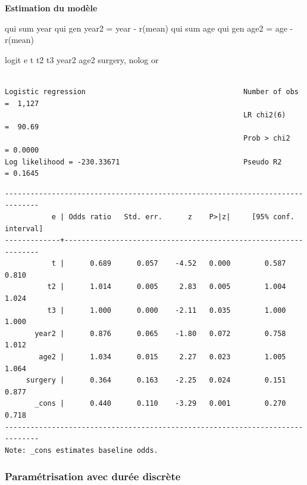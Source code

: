 \documentclass[
  12pt,
  letterpaper,
  DIV=11,
  numbers=noendperiod,
  onepage,
  openany]{scrreprt}
\newenvironment{Shaded}{\begin{snugshade}}{\end{snugshade}}
\newcommand{\FunctionTok}[1]{\textcolor[rgb]{0.94,0.94,0.56}{#1}}
\newcommand{\KeywordTok}[1]{\textcolor[rgb]{0.94,0.87,0.69}{#1}}
\newcommand{\NormalTok}[1]{\textcolor[rgb]{0.80,0.80,0.80}{#1}}
\newcommand{\OtherTok}[1]{\textcolor[rgb]{0.94,0.94,0.56}{#1}}
\begin{document}
\textbf{Estimation du modèle}

\begin{Shaded}
\begin{Highlighting}[]
\KeywordTok{qui} \KeywordTok{sum} \FunctionTok{year}
\KeywordTok{qui} \KeywordTok{gen}\NormalTok{ year2 = }\FunctionTok{year}\NormalTok{ {-} }\OtherTok{\textasciigrave{}r(mean)\textquotesingle{}}
\KeywordTok{qui} \KeywordTok{sum}\NormalTok{ age}
\KeywordTok{qui} \KeywordTok{gen}\NormalTok{ age2 = age {-} }\OtherTok{\textasciigrave{}r(mean)\textquotesingle{}}


\KeywordTok{logit} \FunctionTok{e}\NormalTok{ t t2 t3 year2 age2 surgery, }\KeywordTok{nolog} \KeywordTok{or}
\end{Highlighting}
\end{Shaded}

\begin{verbatim}

Logistic regression                                     Number of obs =  1,127
                                                        LR chi2(6)    =  90.69
                                                        Prob > chi2   = 0.0000
Log likelihood = -230.33671                             Pseudo R2     = 0.1645
\end{verbatim}

\begin{verbatim}
------------------------------------------------------------------------------
           e | Odds ratio   Std. err.      z    P>|z|     [95% conf. interval]
-------------+----------------------------------------------------------------
           t |      0.689      0.057    -4.52   0.000        0.587       0.810
          t2 |      1.014      0.005     2.83   0.005        1.004       1.024
          t3 |      1.000      0.000    -2.11   0.035        1.000       1.000
       year2 |      0.876      0.065    -1.80   0.072        0.758       1.012
        age2 |      1.034      0.015     2.27   0.023        1.005       1.064
     surgery |      0.364      0.163    -2.25   0.024        0.151       0.877
       _cons |      0.440      0.110    -3.29   0.001        0.270       0.718
------------------------------------------------------------------------------
Note: _cons estimates baseline odds.
\end{verbatim}

\hypertarget{paramuxe9trisation-avec-duruxe9e-discruxe8te}{%
\subsubsection{Paramétrisation avec durée
discrète}\label{paramuxe9trisation-avec-duruxe9e-discruxe8te}}
\end{document}
